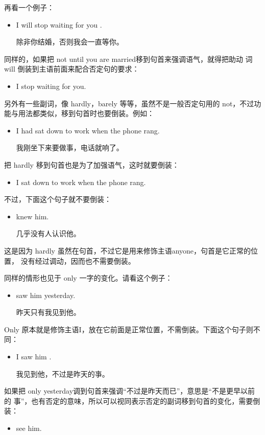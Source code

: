再看一个例子：
\begin{itemize}
\item I will  stop waiting for you .

  除非你结婚，否则我会一直等你。
\end{itemize}
同样的，如果把 not until you are married移到句首来强调语气，就得把助动
词 will 倒装到主语前面来配合否定句的要求：
\begin{itemize}
\item {} I stop waiting for you.
\end{itemize}

另外有一些副词，像 hardly，barely 等等，虽然不是一般否定句用的
not，不过功能与用法都类似，移到句首时也要倒装。例如：
\begin{itemize}
\item I had  sat down to work when the phone rang.

  我刚坐下来要做事，电话就响了。
\end{itemize}
把 hardly 移到句首也是为了加强语气，这时就要倒装：
\begin{itemize}
\item {} I sat down to work when the phone rang.
\end{itemize}

不过，下面这个句子就不要倒装：
\begin{itemize}
\item {} knew him.

  几乎没有人认识他。
\end{itemize}
这是因为 hardly 虽然在句首，不过它是用来修饰主语anyone，句首是它正常的位置，
没有经过调动，因而也不需要倒装。

同样的情形也见于 only 一字的变化。请看这个例子：
\begin{itemize}
\item {} saw him yesterday.

  昨天只有我见到他。
\end{itemize}
Only 原本就是修饰主语I，放在它前面是正常位置，不需倒装。下面这个句子则不同：
\begin{itemize}
\item I saw him .

  我见到他，不过是昨天的亊。
\end{itemize}
如果把 only yesterday调到句首来强调“不过是昨天而已”，意思是“不是更早以前的
事”，也有否定的意味，所以可以视同表示否定的副词移到句首的变化，需要倒装：
\begin{itemize}
\item {} see him.
\end{itemize}

